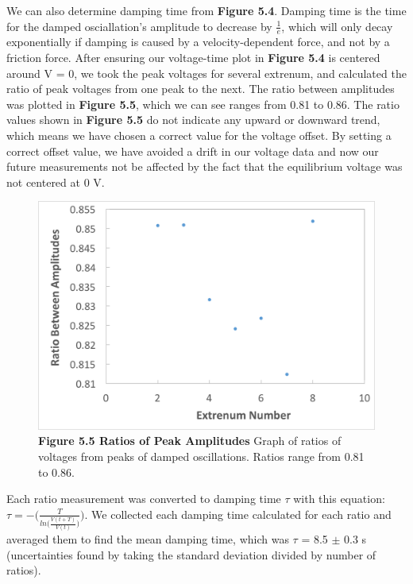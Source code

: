 \documentclass[11pt]{report}
\begin{document}
We can also determine damping time from \textbf{Figure 5.4}.  Damping time is the time for
the damped osciallation's amplitude to decrease by \(\frac{1}{e}\), which will
only decay exponentially if damping is caused by a velocity-dependent force, and
not by a friction force.  After ensuring our voltage-time plot in \textbf{Figure
5.4} is centered around V = 0, we took the peak voltages for several extrenum,
and calculated the ratio of peak voltages from one peak to the next.  The ratio
between amplitudes was plotted in \textbf{Figure 5.5}, which we can see ranges
from 0.81 to 0.86.  The ratio values shown in \textbf{Figure 5.5} do not 
indicate any upward or downward trend, which means we have chosen a correct
value for the voltage offset.  By setting a correct offset value, we have
avoided a drift in our voltage data and now our future measurements not be
affected by the fact that the equilibrium voltage was not centered at 0 V.


\begin{figure}
    \includegraphics[width=\linewidth]{Extrenum.png}
    \captionsetup{labelformat=empty}
    \caption{\textbf{Figure 5.5 Ratios of Peak Amplitudes} Graph of ratios of
    voltages from peaks of damped oscillations.  Ratios range from 0.81 to 0.86.}
\end{figure}

Each ratio measurement was converted to damping time $\tau$ with this equation:
\(\tau = -\Bigg(\frac{T}{ln\bigg(\frac{V(t + T)}{V(t)}\bigg)}\Bigg)\).  We
collected each damping time calculated for each ratio and averaged them to find
the mean damping time, which was $\tau$ = 8.5 $\pm$ 0.3 s (uncertainties found by taking
the standard deviation divided by number of ratios).  
\end{document}
